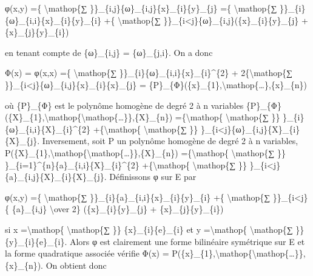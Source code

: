 \documentclass[]{article}
\begin{document}
φ(x,y) =\{ \textbackslash{}mathop\{∑
\}\}\_\{i,j\}\{ω\}\_\{i,j\}\{x\}\_\{i\}\{y\}\_\{j\} =\{
\textbackslash{}mathop\{∑
\}\}\_\{i\}\{ω\}\_\{i,i\}\{x\}\_\{i\}\{y\}\_\{i\} +\{
\textbackslash{}mathop\{∑
\}\}\_\{i\textless{}j\}\{ω\}\_\{i,j\}(\{x\}\_\{i\}\{y\}\_\{j\} +
\{x\}\_\{j\}\{y\}\_\{i\})

en tenant compte de \{ω\}\_\{i,j\} = \{ω\}\_\{j,i\}. On a donc

Φ(x) = φ(x,x) =\{ \textbackslash{}mathop\{∑
\}\}\_\{i\}\{ω\}\_\{i,i\}\{x\}\_\{i\}\^{}\{2\} +
2\{\textbackslash{}mathop\{∑
\}\}\_\{i\textless{}j\}\{ω\}\_\{i,j\}\{x\}\_\{i\}\{x\}\_\{j\} =
\{P\}\_\{Φ\}(\{x\}\_\{1\},\textbackslash{}mathop\{\ldots{}\},\{x\}\_\{n\})

où \{P\}\_\{Φ\} est le polynôme homogène de degré 2 à n variables
\{P\}\_\{Φ\}(\{X\}\_\{1\},\textbackslash{}mathop\{\textbackslash{}mathop\{\ldots{}\}\},\{X\}\_\{n\})
=\{\textbackslash{}mathop\{ \textbackslash{}mathop\{∑ \}\}
\}\_\{i\}\{ω\}\_\{i,i\}\{X\}\_\{i\}\^{}\{2\} +\{\textbackslash{}mathop\{
\textbackslash{}mathop\{∑ \}\}
\}\_\{i\textless{}j\}\{ω\}\_\{i,j\}\{X\}\_\{i\}\{X\}\_\{j\}.
Inversement, soit P un polynôme homogène de degré 2 à n variables,
P(\{X\}\_\{1\},\textbackslash{}mathop\{\textbackslash{}mathop\{\ldots{}\}\},\{X\}\_\{n\})
=\{\textbackslash{}mathop\{ \textbackslash{}mathop\{∑ \}\}
\}\_\{i=1\}\^{}\{n\}\{a\}\_\{i,i\}\{X\}\_\{i\}\^{}\{2\}
+\{\textbackslash{}mathop\{ \textbackslash{}mathop\{∑ \}\}
\}\_\{i\textless{}j\}\{a\}\_\{i,j\}\{X\}\_\{i\}\{X\}\_\{j\}. Définissons
φ sur E par

φ(x,y) =\{ \textbackslash{}mathop\{∑
\}\}\_\{i\}\{a\}\_\{i,i\}\{x\}\_\{i\}\{y\}\_\{i\} +\{
\textbackslash{}mathop\{∑ \}\}\_\{i\textless{}j\}\{ \{a\}\_\{i,j\}
\textbackslash{}over 2\} (\{x\}\_\{i\}\{y\}\_\{j\} +
\{x\}\_\{j\}\{y\}\_\{i\})

si x =\textbackslash{}mathop\{ \textbackslash{}mathop\{∑ \}\}
\{x\}\_\{i\}\{e\}\_\{i\} et y =\textbackslash{}mathop\{
\textbackslash{}mathop\{∑ \}\} \{y\}\_\{i\}\{e\}\_\{i\}. Alors φ est
clairement une forme bilinéaire symétrique sur E et la forme quadratique
associée vérifie Φ(x) =
P(\{x\}\_\{1\},\textbackslash{}mathop\{\textbackslash{}mathop\{\ldots{}\}\},\{x\}\_\{n\}).
On obtient donc
\end{document}
